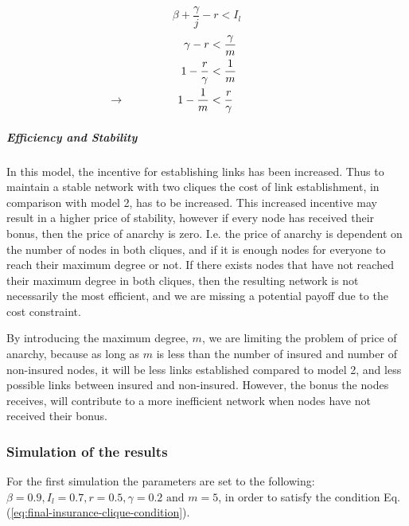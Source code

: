 \begin{equation} 
\beta+\frac{\gamma}{j}-r<I_{l}
\label{eq:lower-boundary-link-insurance-cost}
\end{equation} 
\begin{eqnarray}
\gamma-r &<\frac{\gamma}{m}\nonumber \\
1-\frac{r}{\gamma}&<\frac{1}{m} \nonumber \\
\llap{$\rightarrow$\hspace{50pt}}1-\frac{1}{m}&<\frac{r}{\gamma}
\label{eq:noinsuredcliqueconditon}
\end{eqnarray}


\subparagraph{Efficiency and Stability}

In this model, the incentive for establishing links has been increased. Thus to maintain a stable network with two cliques the cost of link establishment, in comparison with model 2, has to be increased. This increased incentive may result in a higher price of stability, however if every node has received their bonus, then the price of anarchy is zero. I.e. the price of anarchy is dependent on the number of nodes in both cliques, and if it is enough nodes for everyone to reach their maximum degree or not. 
If there exists nodes that have not reached their maximum degree in both cliques, then the resulting network is not necessarily the most efficient, and we are missing a potential payoff due to the cost constraint. 

By introducing the maximum degree, $m$, we are limiting the problem of price of anarchy, because as long as $m$ is less than the number of insured and number of non-insured nodes, it will be less links established compared to model 2, and less possible links between insured and non-insured. However, the bonus the nodes receives, will contribute to a more inefficient network when nodes have not received their bonus.


\subsubsection{Simulation of the results}
For the first simulation the parameters are set to the following: $\beta=0.9, I_{l}=0.7, r=0.5, \gamma=0.2 \text{ and }m=5$, in order to satisfy the condition Eq.(\ref{eq:final-insurance-clique-condition}). 

